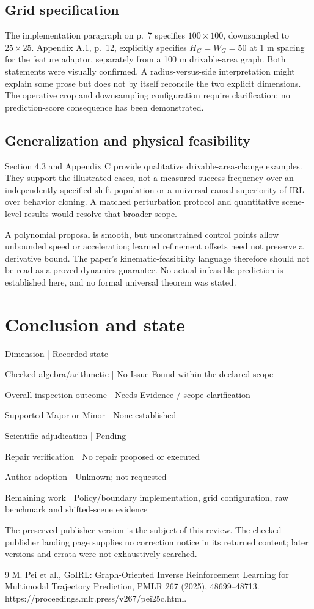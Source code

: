 \documentclass[10pt]{article}
\begin{document}
\subsection*{Grid specification}
The implementation paragraph on p. 7 specifies \(100\times100\), downsampled to \(25\times25\). Appendix A.1, p. 12, explicitly specifies \(H_G=W_G=50\) at 1 m spacing for the feature adaptor, separately from a 100 m drivable-area graph. Both statements were visually confirmed. A radius-versus-side interpretation might explain some prose but does not by itself reconcile the two explicit dimensions. The operative crop and downsampling configuration require clarification; no prediction-score consequence has been demonstrated.\par
\subsection*{Generalization and physical feasibility}
Section 4.3 and Appendix C provide qualitative drivable-area-change examples. They support the illustrated cases, not a measured success frequency over an independently specified shift population or a universal causal superiority of IRL over behavior cloning. A matched perturbation protocol and quantitative scene-level results would resolve that broader scope.\par
A polynomial proposal is smooth, but unconstrained control points allow unbounded speed or acceleration; learned refinement offsets need not preserve a derivative bound. The paper’s kinematic-feasibility language therefore should not be read as a proved dynamics guarantee. No actual infeasible prediction is established here, and no formal universal theorem was stated.\par
\section*{Conclusion and state}
Dimension | Recorded state\par
Checked algebra/arithmetic | No Issue Found within the declared scope\par
Overall inspection outcome | Needs Evidence / scope clarification\par
Supported Major or Minor | None established\par
Scientific adjudication | Pending\par
Repair verification | No repair proposed or executed\par
Author adoption | Unknown; not requested\par
Remaining work | Policy/boundary implementation, grid configuration, raw benchmark and shifted-scene evidence\par
The preserved publisher version is the subject of this review. The checked publisher landing page supplies no correction notice in its returned content; later versions and errata were not exhaustively searched.\par
9 M. Pei et al., GoIRL: Graph-Oriented Inverse Reinforcement Learning for Multimodal Trajectory Prediction, PMLR 267 (2025), 48699–48713. https://proceedings.mlr.press/v267/pei25c.html.\par
\end{document}
